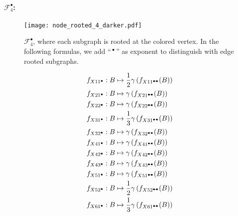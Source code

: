 \documentclass{article}
\theoremstyle{plain}
\begin{document}
\paragraph{$\mathcal{F}_4^\bullet$:}
\begin{figure}
\centering
\texttt{[image: node\_rooted\_4\_darker.pdf]}
\caption{\label{F4n} $\mathcal{F}_4^\bullet$, where each subgraph is rooted at the colored vertex. In the following formulas, we add ``$\,^\bullet\,$'' as exponent to distinguish with edge rooted subgraphs.}
\end{figure}
\begin{align*}
f_{X11^\bullet}: B&\mapsto
 \frac{1}{2}\gamma\left(f_{X11^\dumbbell}(B)\right)\\
f_{X21^\bullet}: B&\mapsto
\gamma\left(f_{X21^\dumbbell}(B)\right)\\
f_{X22^\bullet}: B&\mapsto
\gamma\left(f_{X22^\dumbbell}(B)\right)\\
f_{X31^\bullet}: B&\mapsto
 \frac{1}{3}\gamma\left(f_{X31^\dumbbell}(B)\right)\\
f_{X32^\bullet}: B&\mapsto
\gamma\left(f_{X32^\dumbbell}(B)\right)\\
f_{X41^\bullet}: B&\mapsto
\gamma\left(f_{X41^\dumbbell}(B)\right)\\
f_{X42^\bullet}: B&\mapsto
\gamma\left(f_{X42^\dumbbell}(B)\right)\\
f_{X43^\bullet}: B&\mapsto
\gamma\left(f_{X43^\dumbbell}(B)\right)\\
f_{X51^\bullet}: B&\mapsto
\gamma\left(f_{X51^\dumbbell}(B)\right)\\
f_{X52^\bullet}: B&\mapsto
\frac{1}{2}\gamma\left(f_{X52^\dumbbell}(B)\right)\\
f_{X61^\bullet}: B&\mapsto
\frac{1}{3}\gamma\left(f_{X61^\dumbbell}(B)\right)
\end{align*}
\end{document}
